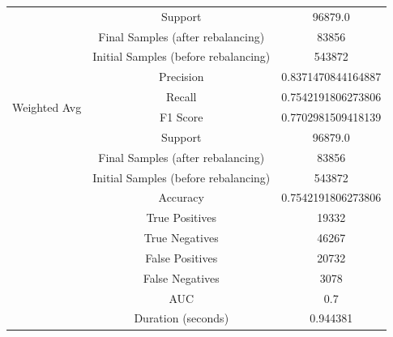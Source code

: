\begin{longtable}{|c|c|c|}
 & Support & 96879.0 \\
 & Final Samples (after rebalancing) & 83856 \\
 & Initial Samples (before rebalancing) & 543872 \\
\hline
\multirow{4}{*}{Weighted Avg} & Precision & 0.8371470844164887 \\
 & Recall & 0.7542191806273806 \\
 & F1 Score & 0.7702981509418139 \\
 & Support & 96879.0 \\
 & Final Samples (after rebalancing) & 83856 \\
 & Initial Samples (before rebalancing) & 543872 \\
\hline
& Accuracy & 0.7542191806273806 \\ \hline
& True Positives & 19332 \\ \hline
& True Negatives & 46267 \\ \hline
& False Positives & 20732 \\ \hline
& False Negatives & 3078 \\ \hline
& AUC & 0.7 \\ \hline
& Duration (seconds) & 0.944381 \\ \hline
\end{longtable}


